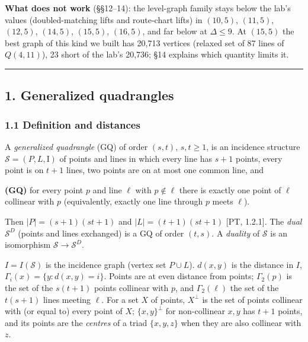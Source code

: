 \documentclass[
  11pt,
]{article}
\begin{document}
\textbf{What does not work} (§§12--14): the level-graph family stays
below the lab's values (doubled-matching lifts and route-chart lifts) in
\((10,5)\), \((11,5)\), \((12,5)\), \((14,5)\), \((15,5)\), \((16,5)\),
and far below at \(\Delta\le 9\). At \((15,5)\) the best graph of this
kind we built has 20,713 vertices (relaxed set of 87 lines of
\(Q(4,11)\)), 23 short of the lab's 20,736; §14 explains which quantity
limits it.

\begin{center}\rule{0.5\linewidth}{0.5pt}\end{center}

\hypertarget{generalized-quadrangles}{%
\subsection{1. Generalized quadrangles}\label{generalized-quadrangles}}

\hypertarget{definition-and-distances}{%
\subsubsection{1.1 Definition and
distances}\label{definition-and-distances}}

A \emph{generalized quadrangle} (GQ) of order \((s,t)\), \(s,t\ge 1\),
is an incidence structure \(\mathcal S = (P, L, \mathrm I)\) of points
and lines in which every line has \(s+1\) points, every point is on
\(t+1\) lines, two points are on at most one common line, and

\textbf{(GQ)} for every point \(p\) and line \(\ell\) with
\(p\notin\ell\) there is exactly one point of \(\ell\) collinear with
\(p\) (equivalently, exactly one line through \(p\) meets \(\ell\)).

Then \(|P| = (s+1)(st+1)\) and \(|L| = (t+1)(st+1)\) {[}PT, 1.2.1{]}.
The \emph{dual} \(\mathcal S^D\) (points and lines exchanged) is a GQ of
order \((t,s)\). A \emph{duality} of \(\mathcal S\) is an isomorphism
\(\mathcal S\to\mathcal S^D\).

\(I = I(\mathcal S)\) is the incidence graph (vertex set \(P\cup L\)).
\(d(x,y)\) is the distance in \(I\),
\(\Gamma_i(x) = \{y: d(x,y) = i\}\). Points are at even distance from
points; \(\Gamma_2(p)\) is the set of the \(s(t+1)\) points collinear
with \(p\), and \(\Gamma_2(\ell)\) the set of the \(t(s+1)\) lines
meeting \(\ell\). For a set \(X\) of points, \(X^\perp\) is the set of
points collinear with (or equal to) every point of \(X\);
\(\{x,y\}^\perp\) for non-collinear \(x,y\) has \(t+1\) points, and its
points are the \emph{centres} of a triad \(\{x,y,z\}\) when they are
also collinear with \(z\).
\end{document}
